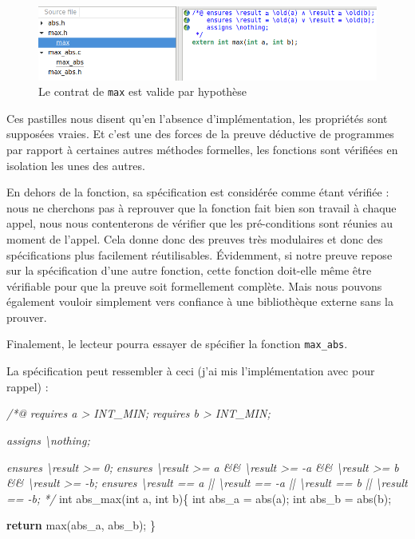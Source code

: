 \documentclass[12pt,francais,]{scrbook}
\newenvironment{Shaded}{}{}
\newcommand{\KeywordTok}[1]{\textcolor[rgb]{0.00,0.44,0.13}{\textbf{{#1}}}}
\newcommand{\DataTypeTok}[1]{\textcolor[rgb]{0.56,0.13,0.00}{{#1}}}
\newcommand{\CommentTok}[1]{\textcolor[rgb]{0.38,0.63,0.69}{\textit{{#1}}}}
\newcommand{\NormalTok}[1]{{#1}}
\begin{document}
\begin{figure}[htbp]
\centering
\includegraphics[scale=0.5]{2-4-max_abs.png}
\caption{Le contrat de \texttt{max} est valide par hypothèse}
\label{fig:2-4-max_abs}
\end{figure}

Ces pastilles nous disent qu'en l'absence d'implémentation, les
propriétés sont supposées vraies. Et c'est une des forces de la preuve
déductive de programmes par rapport à certaines autres méthodes
formelles, les fonctions sont vérifiées en isolation les unes des
autres.

En dehors de la fonction, sa spécification est considérée comme étant
vérifiée : nous ne cherchons pas à reprouver que la fonction fait bien
son travail à chaque appel, nous nous contenterons de vérifier que les
pré-conditions sont réunies au moment de l'appel. Cela donne donc des
preuves très modulaires et donc des spécifications plus facilement
réutilisables. Évidemment, si notre preuve repose sur la spécification
d'une autre fonction, cette fonction doit-elle même être vérifiable pour
que la preuve soit formellement complète. Mais nous pouvons également
vouloir simplement vers confiance à une bibliothèque externe sans la
prouver.

Finalement, le lecteur pourra essayer de spécifier la fonction
\texttt{max\_abs}.

La spécification peut ressembler à ceci (j'ai mis l'implémentation avec
pour rappel) :

\begin{footnotesize}\begin{Shaded}
\begin{Highlighting}[]
\CommentTok{/*@}
\CommentTok{  requires a > INT_MIN;}
\CommentTok{  requires b > INT_MIN;}

\CommentTok{  assigns \textbackslash{}nothing;}

\CommentTok{  ensures \textbackslash{}result >= 0;}
\CommentTok{  ensures \textbackslash{}result >= a && \textbackslash{}result >= -a && \textbackslash{}result >= b && \textbackslash{}result >= -b;}
\CommentTok{  ensures \textbackslash{}result == a || \textbackslash{}result == -a || \textbackslash{}result == b || \textbackslash{}result == -b;}
\CommentTok{*/}
\DataTypeTok{int} \NormalTok{abs_max(}\DataTypeTok{int} \NormalTok{a, }\DataTypeTok{int} \NormalTok{b)\{}
  \DataTypeTok{int} \NormalTok{abs_a = abs(a);}
  \DataTypeTok{int} \NormalTok{abs_b = abs(b);}

  \KeywordTok{return} \NormalTok{max(abs_a, abs_b);}
\NormalTok{\}}
\end{Highlighting}
\end{Shaded}\end{footnotesize}
\end{document}
